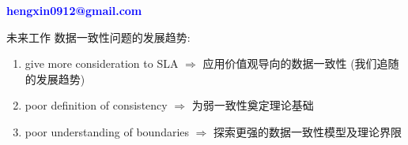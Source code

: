 \begin{frame}[noframenumbering]
  \vspace{-0.8cm}
  \begin{center}
    \textcolor{blue}{\bf \large hengxin0912@gmail.com}
  \end{center}
  \vspace{-0.5cm}
\end{frame}
\begin{frame}{未来工作}
  数据一致性问题的发展趋势:
  \begin{enumerate}
	\item give more consideration to SLA $\Rightarrow$ 应用价值观导向的数据一致性 (我们追随的发展趋势)
	\item poor definition of consistency $\Rightarrow$ 为弱一致性奠定理论基础
	\item poor understanding of boundaries $\Rightarrow$ 探索更强的数据一致性模型及理论界限
  \end{enumerate}
\end{frame}
